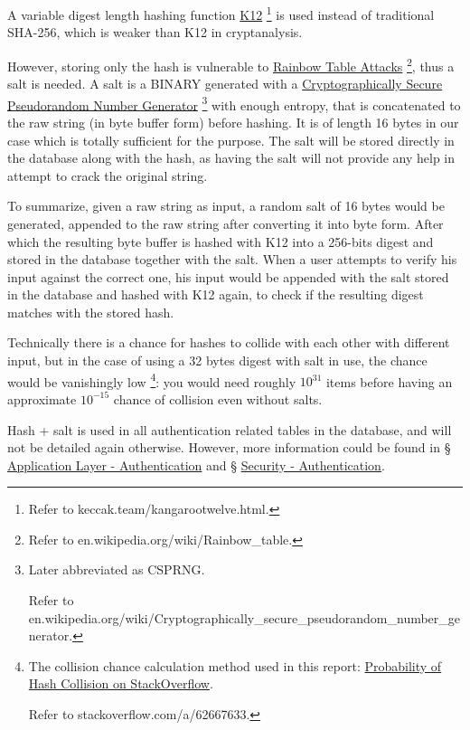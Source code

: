 \documentclass[12pt]{report}
\newcommand{\n}{\par}
\begin{document}
\begin{itemize}
	      A variable digest length hashing function
	      \href{https://keccak.team/kangarootwelve.html}{K12}
	      \footnote{Refer to keccak.team/kangarootwelve.html.}
	      is used instead of traditional SHA-256, which is weaker than K12 in cryptanalysis.\n
	      However, storing only the hash is vulnerable to
	      \href{https://en.wikipedia.org/wiki/Rainbow_table}{Rainbow Table Attacks}
	      \footnote{Refer to en.wikipedia.org\-/wiki/Rainbow\_table.},
	      thus a salt is needed. A salt is a BINARY generated with a
	      \href{https://en.wikipedia.org/wiki/Cryptographically_secure_pseudorandom_number_generator}{Cryptographically Secure Pseudorandom Number Generator}
	      \footnote{Later abbreviated as CSPRNG.\n
		      Refer to en.wikipedia.org/wiki/Cryptographically\_secure\_pseudorandom\_number\_generator.}
	      with enough entropy, that is concatenated to the raw string (in byte buffer form) before hashing.
	      It is of length 16 bytes in our case which is totally sufficient for the purpose.
	      The salt will be stored directly in the database along with the hash,
	      as having the salt will not provide any help in attempt to crack the original string.\n
	      To summarize, given a raw string as input, a random salt of 16 bytes would be generated,
	      appended to the raw string after converting it into byte form.
	      After which the resulting byte buffer is hashed with K12 into a 256-bits digest and stored in the database together with the salt.
	      When a user attempts to verify his input against the correct one,
	      his input would be appended with the salt stored in the database and hashed with K12 again,
	      to check if the resulting digest matches with the stored hash.\n
	      Technically there is a chance for hashes to collide with each other with different input,
	      but in the case of using a 32 bytes digest with salt in use, the chance would be vanishingly low
	      \footnote{The collision chance calculation method used in this report: \href{https://stackoverflow.com/a/62667633}{Probability of Hash Collision on StackOverflow}.\n
		      Refer to stackoverflow.com/a/62667633.}:
	      you would need roughly $10^{31}$ items before having an approximate $10^{-15}$ chance of collision even without salts.\n
	      Hash + salt is used in all authentication related tables in the database, and will not be detailed again otherwise.
	      However, more information could be found in
	      \S{} \hyperref[application-layer.implementation.authentication]{Application Layer - Authentication} and
	      \S{} \hyperref[security.authentication]{Security - Authentication}.
\end{itemize}
\end{document}
